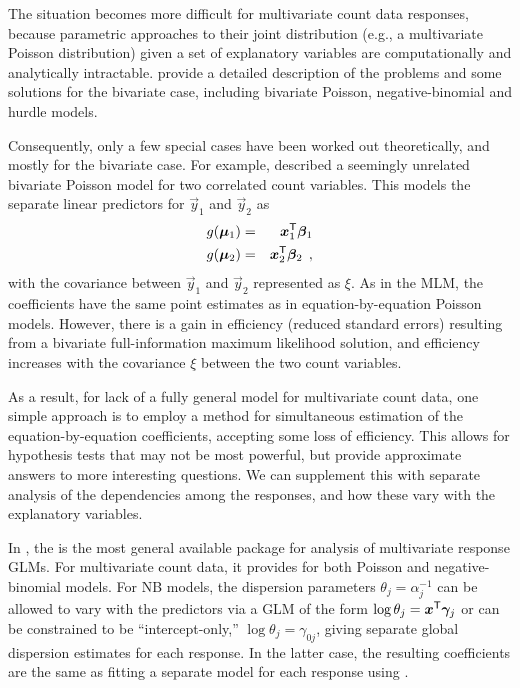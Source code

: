 \documentclass[11pt]{book}\usepackage[]{graphicx}\usepackage[]{color}
\begin{document}
The situation becomes more difficult for multivariate count data responses, because parametric approaches to
their joint distribution (e.g., a multivariate Poisson distribution)
given a set of explanatory variables are computationally and analytically intractable.
\citet[]{CameronTrivedi:2013} provide a detailed description of the problems and some solutions for
the bivariate case, including bivariate Poisson, negative-binomial and hurdle models.

Consequently, only a few special cases have been worked out theoretically, and mostly for the
bivariate case. For example, \cite{King:1989} described a seemingly unrelated bivariate Poisson model
for two correlated count variables. This models the separate linear predictors for $\vec{y}_1$ and
$\vec{y}_2$ as
\begin{eqnarray*}
g(\bm{\mu}_1) & = & \bm{x}_1 ^\mathsf{T} \bm{\beta}_1 \\
g(\bm{\mu}_2) & = & \bm{x}_2 ^\mathsf{T} \bm{\beta}_2       \:\: ,
\end{eqnarray*}
with the covariance between $\vec{y}_1$ and
$\vec{y}_2$ represented as $\xi$. As in the MLM, the coefficients have the same point estimates as
in equation-by-equation Poisson models.  However, there is a gain in efficiency (reduced standard errors)
resulting from a bivariate full-information maximum likelihood solution, and efficiency increases with the
covariance $\xi$ between the two count variables.

As a result, for lack of a fully general model for multivariate count data, one simple approach is to
employ a method for simultaneous estimation of the equation-by-equation coefficients, accepting some loss
of efficiency. This allows for hypothesis tests that may not be most powerful, but provide
approximate answers to more interesting questions.  We can supplement this with separate analysis
of the dependencies among the responses, and how these vary with the explanatory variables.

In \R, the  is the most general available package for analysis of multivariate response GLMs.
For multivariate count data, it provides for both Poisson and negative-binomial models.  For NB
models, the dispersion parameters $\theta_j = \alpha_j^{-1}$ can be allowed to vary with the
predictors via a GLM  of the form
$\log \theta_j = \bm{x}^\mathsf{T} \bm{\gamma}_j$
or can be constrained to be ``intercept-only,''
$\log \theta_j = \gamma_{0j}$,
giving separate global dispersion estimates for each response.
In the latter case, the resulting coefficients are the same as fitting a separate model for
each response using .
\end{document}

